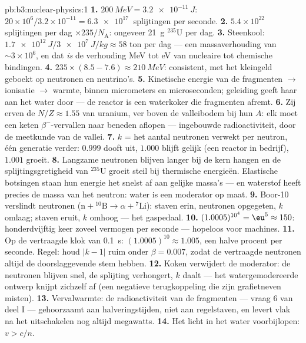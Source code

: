 \begin{solution}{pb:b3:nuclear-physics:1}
\textbf{1.} $\qty{200}{MeV} = \qty{3.2e-11}{J}$:
$20\times10^6/3.2\times10^{-11} = \qty{6.3e17}{}$ splijtingen per
seconde.
\textbf{2.} $5.4\times10^{22}$ splijtingen per dag $\times
235/N_{\text{A}}$: ongeveer \qty{21}{g} $^{235}$U per dag.
\textbf{3.} Steenkool: $\qty{1.7e12}{J}/\qty{3e7}{J/kg} \approx 58$
ton per dag --- een massaverhouding van $\sim3\times10^{6}$, en dat
\emph{is} de verhouding \unit{MeV} tot \unit{eV} van nucleaire tot
chemische bindingen.
\textbf{4.} $235\times(8.5 - 7.6) \approx \qty{210}{MeV}$:
consistent, met het kleingeld geboekt op neutronen en
neutrino's.
\textbf{5.} Kinetische energie van de fragmenten $\to$ ionisatie $\to$ warmte,
binnen micrometers en microseconden; geleiding geeft haar aan het
water door --- de reactor is een waterkoker die fragmenten afremt.
\textbf{6.} Zij erven de $N/Z \approx 1.55$ van uranium, ver
boven de valleibodem bij hun $A$: elk moet een keten
$\beta^-$-vervallen naar beneden aflopen --- ingebouwde radioactiviteit, door de
meetkunde van de vallei.
\textbf{7.} $k$ = het aantal neutronen verwekt per neutron, één generatie
verder: $0.999$ dooft uit, $1.000$ blijft gelijk (een reactor in
bedrijf), $1.001$ groeit.
\textbf{8.} Langzame neutronen blijven langer bij de kern hangen en de
splijtingsgretigheid van $^{235}$U groeit steil bij thermische energieën.
Elastische botsingen staan hun energie het snelst af aan gelijke massa's ---
en waterstof heeft precies de massa van het neutron: water is een moderator
op maat.
\textbf{9.} Boor-10 verslindt neutronen ($\text{n} + {}^{10}
\text{B} \to \alpha + {}^{7}\text{Li}$): staven erin, neutronen
opgegeten, $k$ omlaag; staven eruit, $k$ omhoog --- het gaspedaal.
\textbf{10.} $(1.0005)^{10^4} = \eu^{5} \approx 150$: honderdvijftig
keer zoveel vermogen per seconde --- hopeloos voor machines.
\textbf{11.} Op de vertraagde klok van \qty{0.1}{s}:
$(1.0005)^{10} \approx 1.005$, een halve procent per seconde. Regel:
houd $|k - 1|$ ruim onder $\beta = 0.007$, zodat de vertraagde
neutronen altijd de doorslaggevende stem hebben.
\textbf{12.} Koken verwijdert de moderator: de neutronen blijven snel,
de splijting verhongert, $k$ daalt --- het watergemodereerde ontwerp
knijpt zichzelf af (een negatieve terugkoppeling die zijn grafietneven
misten).
\textbf{13.} Vervalwarmte: de radioactiviteit van de fragmenten ---
vraag 6 van deel I --- gehoorzaamt aan halveringstijden, niet aan regelstaven, en
levert vlak na het uitschakelen nog altijd megawatts.
\textbf{14.} Het licht in het water voorbijlopen: $v > c/n$.

\end{solution}
